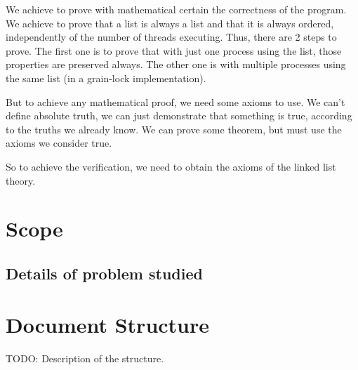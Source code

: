 We achieve to prove with mathematical certain the correctness of the program. We achieve to prove that a list is always a list and that it is always ordered, independently of the number of threads executing. Thus, there are 2 steps to prove. The first one is to prove that with just one process using the list, those properties are preserved always. The other one is with multiple processes using the same list (in a grain-lock implementation).

But to achieve any mathematical proof, we need some axioms to use. We can't define absolute truth, we can just demonstrate that something is true, according to the truths we already know. We can prove some theorem, but must use the axioms we consider true. 

So to achieve the verification, we need to obtain the axioms of the linked list theory.

\section{Scope}



\subsection{Details of problem studied}

\label{def:leap}

\section{Document Structure}

TODO: Description of the structure.
